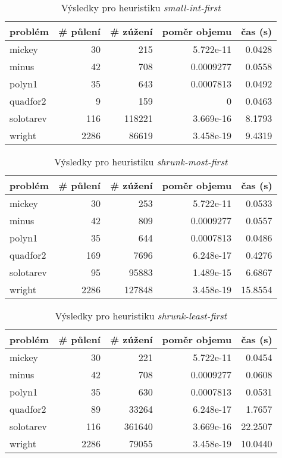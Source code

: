 {\begin{table}[H]
\centering
\begin{tabular}{lrrrr}
\hline
problém & \# půlení & \# zúžení & poměr objemu & čas (s) \\ \hline
mickey & 30 & 215 & 5.722e-11 & 0.0428 \\
minus & 42 & 708 & 0.0009277 & 0.0558 \\
polyn1 & 35 & 643 & 0.0007813 & 0.0492 \\
quadfor2 & 9 & 159 & 0 & 0.0463 \\
solotarev & 116 & 118221 & 3.669e-16 & 8.1793 \\
wright & 2286 & 86619 & 3.458e-19 & 9.4319 \\
\end{tabular}
\caption{Výsledky pro heuristiku \emph{small-int-first}}
\label{small-int-first}
\end{table}



\begin{table}[H]
\centering
\begin{tabular}{lrrrr}
\hline
problém & \# půlení & \# zúžení & poměr objemu & čas (s) \\ \hline
mickey & 30 & 253 & 5.722e-11 & 0.0533 \\
minus & 42 & 809 & 0.0009277 & 0.0557 \\
polyn1 & 35 & 644 & 0.0007813 & 0.0486 \\
quadfor2 & 169 & 7696 & 6.248e-17 & 0.4276 \\
solotarev & 95 & 95883 & 1.489e-15 & 6.6867 \\
wright & 2286 & 127848 & 3.458e-19 & 15.8554 \\
\end{tabular}
\caption{Výsledky pro heuristiku \emph{shrunk-most-first}}
\label{shrunk-most-first}
\end{table}



\begin{table}[H]
\centering
\begin{tabular}{lrrrr}
\hline
problém & \# půlení & \# zúžení & poměr objemu & čas (s) \\ \hline
mickey & 30 & 221 & 5.722e-11 & 0.0454 \\
minus & 42 & 708 & 0.0009277 & 0.0608 \\
polyn1 & 35 & 630 & 0.0007813 & 0.0531 \\
quadfor2 & 89 & 33264 & 6.248e-17 & 1.7657 \\
solotarev & 116 & 361640 & 3.669e-16 & 22.2507 \\
wright & 2286 & 79055 & 3.458e-19 & 10.0440 \\
\end{tabular}
\caption{Výsledky pro heuristiku \emph{shrunk-least-first}}
\label{shrunk-least-first}
\end{table}



}
